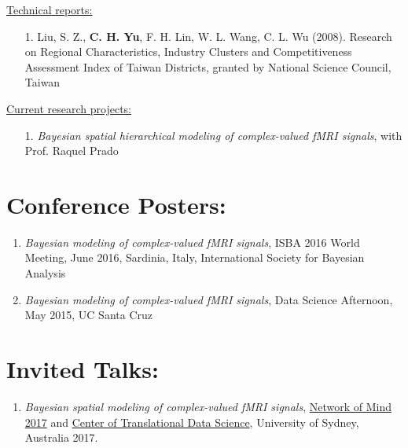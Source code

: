 \documentclass[]{res}
\begin{document}
\begin{resume}
\underline{Technical reports:}
\begin{itemize}
\item[1.] Liu, S. Z., \textbf{C. H. Yu}, F. H. Lin, W. L. Wang, C. L. Wu (2008). Research on Regional Characteristics, Industry Clusters and Competitiveness Assessment Index of Taiwan Districts, granted by National Science Council, Taiwan
\end{itemize}
\underline{Current research projects:}
\begin{itemize} %
\item[1.] \textit{Bayesian spatial hierarchical modeling of complex-valued fMRI signals}, with Prof. Raquel Prado
\end{itemize}

\section{Conference Posters:}
\begin{enumerate}
	\item \textit{Bayesian modeling of complex-valued fMRI signals}, ISBA 2016 World Meeting, June 2016, Sardinia, Italy, International Society for Bayesian Analysis
	\item \textit{Bayesian modeling of complex-valued fMRI signals}, Data Science Afternoon, May 2015, UC Santa Cruz
\end{enumerate}

\section{Invited Talks:}
\begin{enumerate}
	\item \textit{Bayesian spatial modeling of complex-valued fMRI signals}, \href{http://www.networkofmind.net/index.html}{Network of Mind 2017} and \href{http://sydney.edu.au/data-science/}{Center of Translational Data Science}, University of Sydney, Australia 2017.
	
	
\end{enumerate}


\end{resume}
\end{document}
